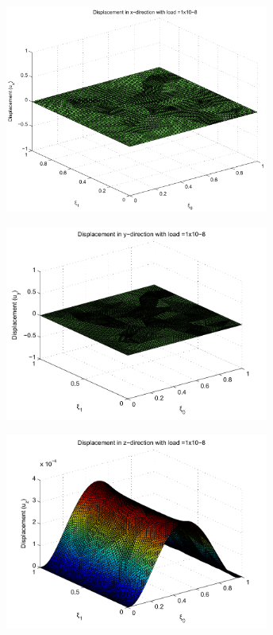  
\begin{DoxyImage}
\includegraphics[width=0.65\textwidth]{Plate_x_direction}
\end{DoxyImage}


 
\begin{DoxyImage}
\includegraphics[width=0.65\textwidth]{Plate_y_direction}
\end{DoxyImage}


 
\begin{DoxyImage}
\includegraphics[width=0.65\textwidth]{Plate_z_direction}
\end{DoxyImage}



